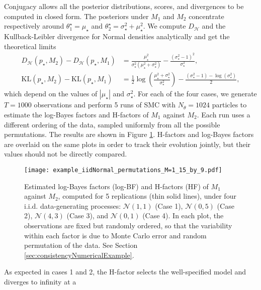 \documentclass[12pt]{article}
\theoremstyle{plain}
\theoremstyle{definition}
\begin{document}
	Conjugacy allows all the posterior distributions, scores, and
	divergences to be computed in closed form. The posteriors under
	$M_1$ and $M_2$ concentrate respectively around $\theta^\star_1=\mu_\star$ and
	$\theta^\star_2=\sigma_\star^2 + \mu_\star^2$. We compute $D_\mathcal{H}$ and the
	Kullback-Leibler divergence for Normal densities analytically \citep[see
	Section 6.1 of][]{dawid2015} and get the theoretical limits
	\setlength{\jot}{10pt}
	\begin{align}
	D_\mathcal{H}(p_\star,M_2)-D_\mathcal{H}(p_\star,M_1)&=\frac{\mu_\star^2}{\sigma_\star^2\left(\mu_\star^2+\sigma_\star^2\right)} - \frac{\left(\sigma_\star^2-1\right)^2}{\sigma_\star^2},
	\label{eq:slopeH}
	\\
	\text{KL}(p_\star,M_2)-\text{KL}(p_\star,M_1)&=\frac{1}{2}\log\left(\frac{\mu_\star^2+\sigma_\star^2}{\sigma_\star^2}\right) - \frac{\left(\sigma_\star^2-1\right)-\log\left(\sigma_\star^2\right)}{2},
	\label{eq:slopeLBF}
	\end{align}
	\setlength{\jot}{5pt}
	which depend on the values of $|\mu_\star|$ and $\sigma_\star^2$.
	For each of the four cases, we generate $T=1000$
	observations and perform 5 runs of SMC with $N_\theta=1024$ particles to
	estimate the log-Bayes factors and H-factors of $M_1$ against $M_2$. Each run uses a different ordering of the data, sampled uniformly from all the possible permutations. The
	results are shown in Figure \ref{fig:iidNormal}. H-factors and log-Bayes factors are overlaid on the same plots in order to track their evolution jointly, but their values should not be directly compared.
	\begin{figure}[h]
		\texttt{[image: example\_iidNormal\_permutations\_M=1\_15\_by\_9.pdf]}
		\centering
		\caption{Estimated log-Bayes factors (log-BF) and H-factors (HF) of $M_1$ against $M_2$, computed for 5 replications (thin solid lines), under four i.i.d.\! data-generating processes: $\mathcal{N}(1,1)$ (Case 1), $\mathcal{N}(0,5)$ (Case 2), $\mathcal{N}(4,3)$ (Case 3), and $\mathcal{N}(0,1)$ (Case 4). In each plot, the observations are fixed but randomly ordered, so that the variability within each factor is due to Monte Carlo error and random permutation of the data. See Section \ref{sec:consistencyNumericalExample}.}
		\label{fig:iidNormal}
	\end{figure}
	As expected in cases 1 and 2,
	the H-factor selects the well-specified model and diverges to infinity at a
\end{document}
